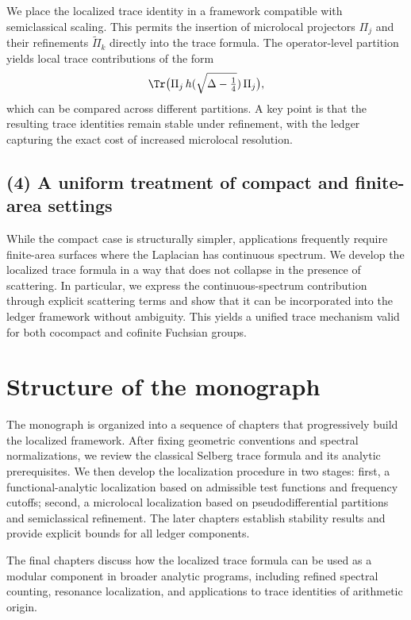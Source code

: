 We place the localized trace identity in a framework compatible with semiclassical scaling.
This permits the insertion of microlocal projectors $\Pi_j$ and their refinements $\widetilde{\Pi}_k$ directly into the trace formula.
The operator-level partition yields local trace contributions of the form
\[
\Tr\bigl(\Pi_j\, h(\sqrt{\Delta-\tfrac14})\, \Pi_j\bigr),
\]
which can be compared across different partitions.
A key point is that the resulting trace identities remain stable under refinement, with the ledger capturing the exact cost of increased microlocal resolution.

\subsection*{(4) A uniform treatment of compact and finite-area settings}

While the compact case is structurally simpler, applications frequently require finite-area surfaces where the Laplacian has continuous spectrum.
We develop the localized trace formula in a way that does not collapse in the presence of scattering.
In particular, we express the continuous-spectrum contribution through explicit scattering terms and show that it can be incorporated into the ledger framework without ambiguity.
This yields a unified trace mechanism valid for both cocompact and cofinite Fuchsian groups.

\section*{Structure of the monograph}

The monograph is organized into a sequence of chapters that progressively build the localized framework.
After fixing geometric conventions and spectral normalizations, we review the classical Selberg trace formula and its analytic prerequisites.
We then develop the localization procedure in two stages:
first, a functional-analytic localization based on admissible test functions and frequency cutoffs;
second, a microlocal localization based on pseudodifferential partitions and semiclassical refinement.
The later chapters establish stability results and provide explicit bounds for all ledger components.

The final chapters discuss how the localized trace formula can be used as a modular component in broader analytic programs, including refined spectral counting, resonance localization, and applications to trace identities of arithmetic origin.

